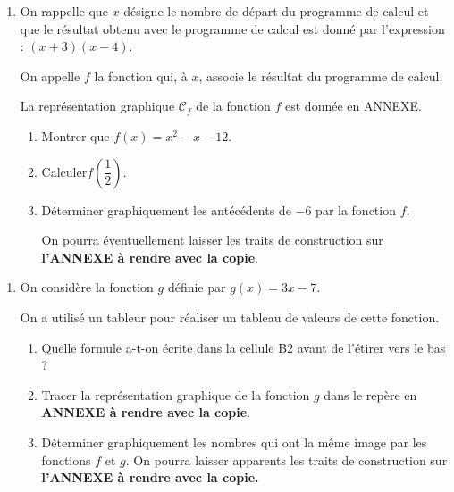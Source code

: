 \documentclass[11pt]{article}
\begin{document}
\begin{enumerate}[resume]
\item On rappelle que $x$ désigne le nombre de départ du programme de calcul et que le résultat obtenu avec le programme de calcul est donné par l'expression : $(x + 3)(x - 4)$.

On appelle $f$ la fonction qui, à $x$, associe le résultat du programme de calcul.

La représentation graphique $\mathcal{C}_f$ de la fonction $f$ est donnée en ANNEXE.
	\begin{enumerate}
		\item Montrer que $f(x) = x^2 - x - 12$.
		\item Calculer$f\left(\dfrac12\right)$.
		\item Déterminer graphiquement les antécédents de $- 6$ par la fonction $f$.

On pourra éventuellement laisser les traits de construction sur \textbf{l'ANNEXE à rendre avec la copie}.
	\end{enumerate}
\end{enumerate}
\begin{minipage}{10cm}
\begin{enumerate}[resume]
\item On considère la fonction $g$ définie par $g(x) = 3x - 7$.

On a utilisé un tableur pour réaliser un tableau de valeurs de cette fonction.
	\begin{enumerate}
		\item Quelle formule a-t-on écrite dans la cellule B2 avant de l'étirer vers le bas ?
		\item Tracer la représentation graphique de la fonction $g$ dans le repère en \textbf{ANNEXE à rendre avec la copie}.
		\item Déterminer graphiquement les nombres qui ont la même image par les fonctions $f$ et $g$. On pourra laisser apparents les traits de construction sur \textbf{l'ANNEXE à rendre avec la copie.}
	\end{enumerate}
\end{enumerate}
\end{minipage}\hfill
\end{document}
